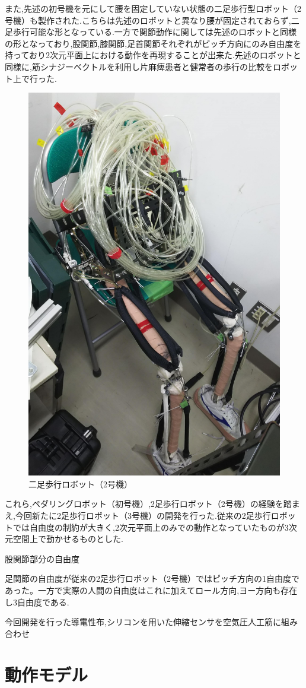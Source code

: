 また,先述の初号機を元にして腰を固定していない状態の二足歩行型ロボット（2号機）も製作された.こちらは先述のロボットと異なり腰が固定されておらず,二足歩行可能な形となっている.一方で関節動作に関しては先述のロボットと同様の形となっており,股関節,膝関節,足首関節それぞれがピッチ方向にのみ自由度を持っており2次元平面上における動作を再現することが出来た.先述のロボットと同様に,筋シナジーベクトルを利用し片麻痺患者と健常者の歩行の比較をロボット上で行った.
\begin{figure}[h]
  \begin{center}
  \includegraphics[width=0.5\columnwidth,clip]{Photo/BackGround/2nd.eps}
  \caption{二足歩行ロボット（2号機）}
  \label{2号機}
 \end{center}
\end{figure}

これら,ペダリングロボット（初号機）,2足歩行ロボット（2号機）の経験を踏まえ,今回新たに2足歩行ロボット（3号機）の開発を行った.従来の2足歩行ロボットでは自由度の制約が大きく,2次元平面上のみでの動作となっていたものが3次元空間上で動かせるものとした.

股関節部分の自由度

足関節の自由度が従来の2足歩行ロボット（2号機）ではピッチ方向の1自由度であった。一方で実際の人間の自由度はこれに加えてロール方向,ヨー方向も存在し3自由度である.

今回開発を行った導電性布,シリコンを用いた伸縮センサを空気圧人工筋に組み合わせ
\section{動作モデル}
